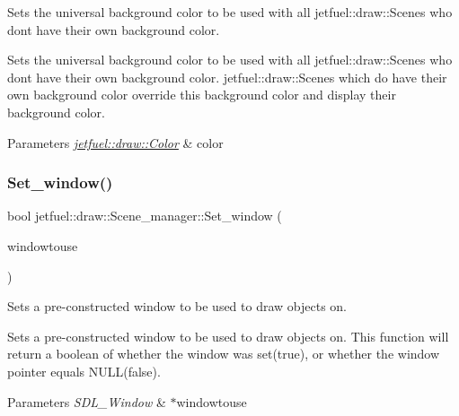 Sets the universal background color to be used with all jetfuel\+::draw\+::\+Scenes who don\textquotesingle{}t have their own background color. 

Sets the universal background color to be used with all jetfuel\+::draw\+::\+Scenes who don\textquotesingle{}t have their own background color. jetfuel\+::draw\+::\+Scenes which do have their own background color override this background color and display their background color.


\begin{DoxyParams}{Parameters}
{\em \hyperlink{classjetfuel_1_1draw_1_1Color}{jetfuel\+::draw\+::\+Color}} & color \\
\hline
\end{DoxyParams}
\mbox{\label{classjetfuel_1_1draw_1_1Scene__manager_a3a13d30af1a38eddd47c4959062b3d9b}} 
\subsubsection{\texorpdfstring{Set\+\_\+window()}{Set\_window()}}
{\footnotesize\ttfamily bool jetfuel\+::draw\+::\+Scene\+\_\+manager\+::\+Set\+\_\+window (\begin{DoxyParamCaption}\item[{S\+D\+L\+\_\+\+Window $\ast$}]{windowtouse }\end{DoxyParamCaption})}



Sets a pre-\/constructed window to be used to draw objects on. 

Sets a pre-\/constructed window to be used to draw objects on. This function will return a boolean of whether the window was set(true), or whether the window pointer equals N\+U\+L\+L(false).


\begin{DoxyParams}{Parameters}
{\em S\+D\+L\+\_\+\+Window} & $\ast$windowtouse \\
\hline
\end{DoxyParams}
\mbox{\label{classjetfuel_1_1draw_1_1Scene__manager_a1205e2dd88e98603c4fad97bb1febf99}} 
